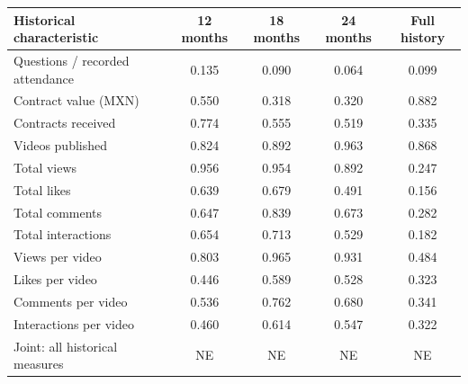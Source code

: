 \begingroup\small
\setlength{\tabcolsep}{3pt}
\renewcommand{\arraystretch}{1.25}
\noindent%
\begin{tabular*}{\linewidth}{@{\extracolsep{\fill}}lcccc@{}}
\toprule
Historical characteristic & 12 months & 18 months & 24 months & Full history \\
\midrule
Questions / recorded attendance & 0.135 & 0.090 & 0.064 & 0.099 \\
\addlinespace
Contract value (MXN) & 0.550 & 0.318 & 0.320 & 0.882 \\
Contracts received & 0.774 & 0.555 & 0.519 & 0.335 \\
\addlinespace
Videos published & 0.824 & 0.892 & 0.963 & 0.868 \\
Total views & 0.956 & 0.954 & 0.892 & 0.247 \\
Total likes & 0.639 & 0.679 & 0.491 & 0.156 \\
Total comments & 0.647 & 0.839 & 0.673 & 0.282 \\
Total interactions & 0.654 & 0.713 & 0.529 & 0.182 \\
Views per video & 0.803 & 0.965 & 0.931 & 0.484 \\
Likes per video & 0.446 & 0.589 & 0.528 & 0.323 \\
Comments per video & 0.536 & 0.762 & 0.680 & 0.341 \\
Interactions per video & 0.460 & 0.614 & 0.547 & 0.322 \\
\midrule
Joint: all historical measures & NE & NE & NE & NE \\
\bottomrule
\end{tabular*}\par\endgroup
